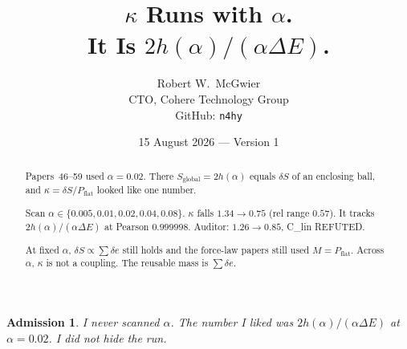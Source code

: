 \documentclass[11pt]{article}
\title{\textbf{$\kappa$ Runs with $\alpha$.\\
It Is $2h(\alpha)/(\alpha\Delta E)$.}}
\author{Robert W.\ McGwier\\
\small CTO, Cohere Technology Group\\
\small GitHub: \texttt{n4hy}}
\date{15 August 2026 --- Version 1}
\newtheorem*{admission}{Admission}
\begin{document}
\maketitle

\begin{abstract}
\noindent
Papers~46--59 used $\alpha=0.02$. There
$S_{\mathrm{global}}=2h(\alpha)$ equals $\delta S$ of
an enclosing ball, and $\kappa=\delta S/P_{\mathrm{flat}}$
looked like one number.

Scan $\alpha\in\{0.005,0.01,0.02,0.04,0.08\}$.
$\kappa$ falls $1.34\to 0.75$ (rel range $0.57$).
It tracks $2h(\alpha)/(\alpha\Delta E)$ at Pearson
$0.999998$. Auditor: $1.26\to 0.85$, C\_lin REFUTED.

At fixed $\alpha$, $\delta S\propto\sum\delta e$ still
holds and the force-law papers still used
$M=P_{\mathrm{flat}}$. Across $\alpha$, $\kappa$ is
not a coupling. The reusable mass is $\sum\delta e$.
\end{abstract}

\begin{admission}
I never scanned $\alpha$. The number I liked was
$2h(\alpha)/(\alpha\Delta E)$ at $\alpha=0.02$. I
did not hide the run.
\end{admission}
\end{document}
